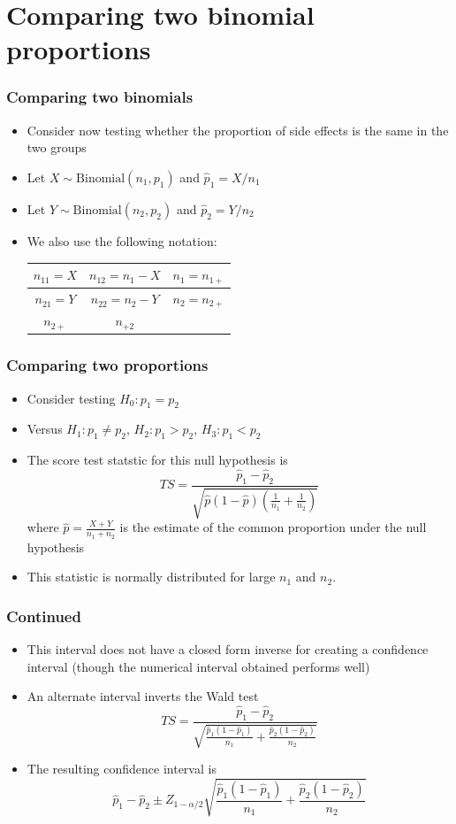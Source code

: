 \documentclass[aspectratio=169]{beamer}
\begin{document}
\section{Comparing two binomial proportions}
\begin{frame}\frametitle{Comparing two binomials}
  \begin{itemize}
  \item Consider now testing whether the proportion of side effects is the same
    in the two groups
  \item Let $X \sim \mathrm{Binomial}(n_1, p_1)$ and $\hat p_1 = X / n_1$
  \item Let $Y \sim \mathrm{Binomial}(n_2, p_2)$ and $\hat p_2 = Y / n_2$
  \item We also use the following notation:
    \begin{center}
      \begin{tabular}{|c|c|c|}\hline
        $n_{11} = X$ & $n_{12} = n_1 - X$ & $n_1 = n_{1+}$ \\ \hline
        $n_{21} = Y$ & $n_{22} = n_2 - Y$ & $n_2 = n_{2+}$ \\ \hline
        $n_{2+}$     & $n_{+2}$           &       \\ \hline 
      \end{tabular}
    \end{center}
  \end{itemize}
\end{frame}

\begin{frame}\frametitle{Comparing two proportions}
  \begin{itemize}
  \item Consider testing $H_0:p_1 = p_2$ 
  \item Versus $H_1:p_1 \neq p_2$, $H_2:p_1>p_2$, $H_3:p_1 < p_2$ 
  \item The score test statstic for this null hypothesis is
    $$
    TS = \frac{\hat p_1 - \hat p_2}{\sqrt{\hat p (1 - \hat p)(\frac{1}{n_1} + \frac{1}{n_2})}}
    $$
    where $\hat p = \frac{X + Y}{n_1 + n_2}$ is the estimate of the
    common proportion under the null hypothesis
  \item This statistic is normally distributed for large $n_1$ and
    $n_2$.
  \end{itemize}
\end{frame}

\begin{frame}\frametitle{Continued}
  \begin{itemize}
  \item This interval does not have a closed form inverse for creating a
    confidence interval (though the numerical interval obtained performs
    well)
  \item An alternate interval inverts the Wald test
    $$
    TS = \frac{\hat p_1 - \hat p_2}{\sqrt{\frac{\hat p_1 (1 - \hat p_1)}{n_1} + \frac{\hat p_2(1 - \hat p_2)}{n_2}}}
    $$
  \item The resulting confidence interval is
    $$
    \hat p_1 - \hat p_2 \pm Z_{1-\alpha / 2}\sqrt{\frac{\hat p_1 (1 - \hat p_1)}{n_1} + \frac{\hat p_2(1 - \hat p_2)}{n_2}}
    $$
    \end{itemize}
  \end{frame}
\end{document}
